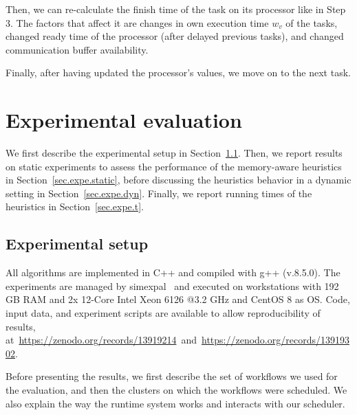\documentclass[conference]{IEEEtran}
\newcommand{\skug}[1]{{\color{blue}[SK: #1]}}
\newcommand{\hmey}[1]{{\color{red}[HM: #1]}}
\begin{document}
    Then, we can re-calculate the finish time of the task on its processor like in Step 3.
    The factors that affect it are changes in own execution time $w_v$ of the tasks, changed ready time of the processor
    (after delayed previous tasks), and changed communication buffer availability.

    Finally, after having updated the processor's values, we move on to the next task.





\section{Experimental evaluation} %
\label{sec:expe}

We first describe the experimental setup in Section~\ref{sec:setup}. 
Then, we report results on static experiments to assess the performance
of the memory-aware heuristics in Section~\ref{sec.expe.static}, before
discussing the heuristics behavior in a dynamic setting in Section~\ref{sec.expe.dyn}. 
Finally, we report running times of the heuristics in Section~\ref{sec.expe.t}. 

\subsection{Experimental setup} %
    \label{sec:setup}

    All algorithms are implemented in C++ and compiled with g++ (v.8.5.0).
    The experiments are managed by simexpal~\cite{DBLP:journals/algorithms/AngrimanGLMNPT19} and executed on workstations with 192 GB RAM and 2x 12-Core Intel Xeon 6126 @3.2 GHz
    and CentOS 8 as OS.
    Code, input data, and experiment scripts are available to allow reproducibility of results, at~\url{https://zenodo.org/records/13919214}~and~\url{https://zenodo.org/records/13919302}.

    Before presenting the results, we first describe the set of workflows we used for the evaluation, and then the clusters on which the
    workflows were scheduled.
We also explain the way the runtime system works and interacts with our scheduler. 
\end{document}
